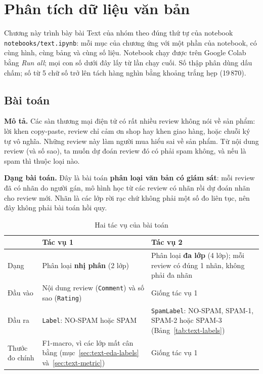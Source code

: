 \chapter{Phân tích dữ liệu văn bản}
\label{chap:text}
\sloppy

Chương này trình bày bài Text của nhóm theo đúng thứ tự của notebook \texttt{notebooks/text.ipynb}:
mỗi mục của chương ứng với một phần của notebook, có cùng hình, cùng bảng và cùng số liệu.
Notebook chạy được trên Google Colab bằng \textit{Run all}; mọi con số dưới đây lấy từ lần chạy cuối.
Số thập phân dùng dấu chấm; số từ 5 chữ số trở lên tách hàng nghìn bằng khoảng trắng hẹp (19\,870).

\section{Bài toán}
\label{sec:text-problem}

\textbf{Mô tả.} Các sàn thương mại điện tử có rất nhiều review không nói về sản phẩm: lời khen copy-paste,
review chỉ cảm ơn shop hay khen giao hàng, hoặc chuỗi ký tự vô nghĩa. Những review này làm người mua hiểu sai
về sản phẩm. Từ nội dung review (và số sao), ta muốn dự đoán review đó có phải spam không, và nếu là spam thì thuộc loại nào.

\textbf{Dạng bài toán.} Đây là bài toán \textbf{phân loại văn bản có giám sát}: mỗi review đã có nhãn do người gán,
mô hình học từ các review có nhãn rồi dự đoán nhãn cho review mới. Nhãn là các lớp rời rạc chứ không phải một số đo
liên tục, nên đây không phải bài toán hồi quy.

\begin{table}[H]
\centering
\caption{Hai tác vụ của bài toán}
\label{tab:text-tasks}
\begin{tabular}{>{\raggedright\arraybackslash}p{2.6cm}>{\raggedright\arraybackslash}p{5.6cm}>{\raggedright\arraybackslash}p{6.0cm}}
\toprule
& Tác vụ 1 & Tác vụ 2\\
\midrule
Dạng & Phân loại \textbf{nhị phân} (2 lớp) & Phân loại \textbf{đa lớp} (4 lớp); mỗi review có đúng 1 nhãn, không phải đa nhãn\\
Đầu vào & Nội dung review (\texttt{Comment}) và số sao (\texttt{Rating}) & Giống tác vụ 1\\
Đầu ra & \texttt{Label}: NO-SPAM hoặc SPAM & \texttt{SpamLabel}: NO-SPAM, SPAM-1, SPAM-2 hoặc SPAM-3 (Bảng~\ref{tab:text-labels})\\
Thước đo chính & F1-macro, vì các lớp mất cân bằng (mục~\ref{sec:text-eda-labels} và~\ref{sec:text-metric}) & Giống tác vụ 1\\
\bottomrule
\end{tabular}
\end{table}

